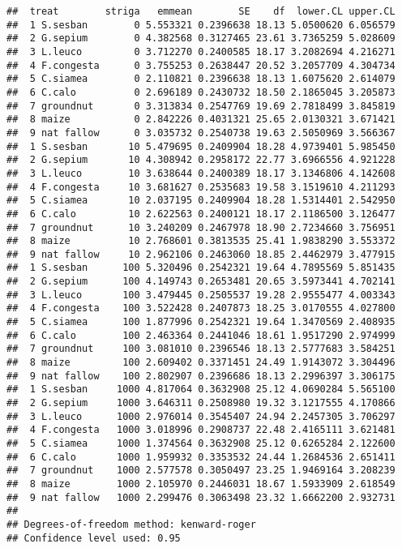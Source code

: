 \documentclass[]{book}
\theoremstyle{definition}
\theoremstyle{definition}
\theoremstyle{definition}
\theoremstyle{remark}
\begin{document}
\begin{verbatim}
##  treat        striga   emmean        SE    df  lower.CL upper.CL
##  1 S.sesban        0 5.553321 0.2396638 18.13 5.0500620 6.056579
##  2 G.sepium        0 4.382568 0.3127465 23.61 3.7365259 5.028609
##  3 L.leuco         0 3.712270 0.2400585 18.17 3.2082694 4.216271
##  4 F.congesta      0 3.755253 0.2638447 20.52 3.2057709 4.304734
##  5 C.siamea        0 2.110821 0.2396638 18.13 1.6075620 2.614079
##  6 C.calo          0 2.696189 0.2430732 18.50 2.1865045 3.205873
##  7 groundnut       0 3.313834 0.2547769 19.69 2.7818499 3.845819
##  8 maize           0 2.842226 0.4031321 25.65 2.0130321 3.671421
##  9 nat fallow      0 3.035732 0.2540738 19.63 2.5050969 3.566367
##  1 S.sesban       10 5.479695 0.2409904 18.28 4.9739401 5.985450
##  2 G.sepium       10 4.308942 0.2958172 22.77 3.6966556 4.921228
##  3 L.leuco        10 3.638644 0.2400389 18.17 3.1346806 4.142608
##  4 F.congesta     10 3.681627 0.2535683 19.58 3.1519610 4.211293
##  5 C.siamea       10 2.037195 0.2409904 18.28 1.5314401 2.542950
##  6 C.calo         10 2.622563 0.2400121 18.17 2.1186500 3.126477
##  7 groundnut      10 3.240209 0.2467978 18.90 2.7234660 3.756951
##  8 maize          10 2.768601 0.3813535 25.41 1.9838290 3.553372
##  9 nat fallow     10 2.962106 0.2463060 18.85 2.4462979 3.477915
##  1 S.sesban      100 5.320496 0.2542321 19.64 4.7895569 5.851435
##  2 G.sepium      100 4.149743 0.2653481 20.65 3.5973441 4.702141
##  3 L.leuco       100 3.479445 0.2505537 19.28 2.9555477 4.003343
##  4 F.congesta    100 3.522428 0.2407873 18.25 3.0170555 4.027800
##  5 C.siamea      100 1.877996 0.2542321 19.64 1.3470569 2.408935
##  6 C.calo        100 2.463364 0.2441046 18.61 1.9517290 2.974999
##  7 groundnut     100 3.081010 0.2396546 18.13 2.5777683 3.584251
##  8 maize         100 2.609402 0.3371451 24.49 1.9143072 3.304496
##  9 nat fallow    100 2.802907 0.2396686 18.13 2.2996397 3.306175
##  1 S.sesban     1000 4.817064 0.3632908 25.12 4.0690284 5.565100
##  2 G.sepium     1000 3.646311 0.2508980 19.32 3.1217555 4.170866
##  3 L.leuco      1000 2.976014 0.3545407 24.94 2.2457305 3.706297
##  4 F.congesta   1000 3.018996 0.2908737 22.48 2.4165111 3.621481
##  5 C.siamea     1000 1.374564 0.3632908 25.12 0.6265284 2.122600
##  6 C.calo       1000 1.959932 0.3353532 24.44 1.2684536 2.651411
##  7 groundnut    1000 2.577578 0.3050497 23.25 1.9469164 3.208239
##  8 maize        1000 2.105970 0.2446031 18.67 1.5933909 2.618549
##  9 nat fallow   1000 2.299476 0.3063498 23.32 1.6662200 2.932731
## 
## Degrees-of-freedom method: kenward-roger 
## Confidence level used: 0.95
\end{verbatim}
\end{document}
